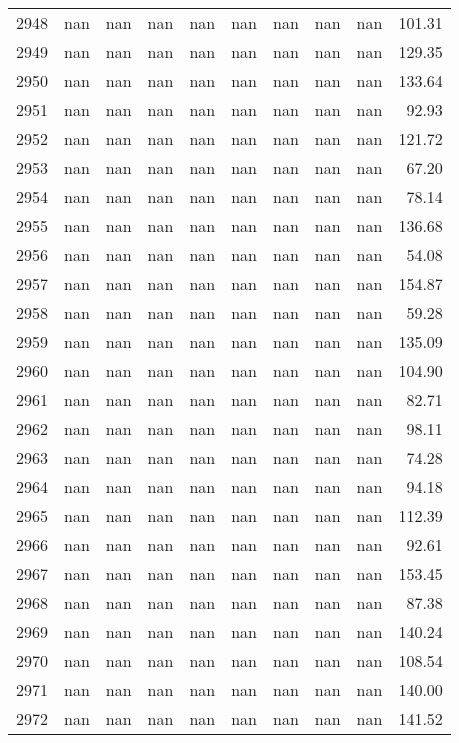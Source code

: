 \begin{tabular}{lrrrrrrrrr}
2948 & nan & nan & nan & nan & nan & nan & nan & nan & 101.31 \\
2949 & nan & nan & nan & nan & nan & nan & nan & nan & 129.35 \\
2950 & nan & nan & nan & nan & nan & nan & nan & nan & 133.64 \\
2951 & nan & nan & nan & nan & nan & nan & nan & nan & 92.93 \\
2952 & nan & nan & nan & nan & nan & nan & nan & nan & 121.72 \\
2953 & nan & nan & nan & nan & nan & nan & nan & nan & 67.20 \\
2954 & nan & nan & nan & nan & nan & nan & nan & nan & 78.14 \\
2955 & nan & nan & nan & nan & nan & nan & nan & nan & 136.68 \\
2956 & nan & nan & nan & nan & nan & nan & nan & nan & 54.08 \\
2957 & nan & nan & nan & nan & nan & nan & nan & nan & 154.87 \\
2958 & nan & nan & nan & nan & nan & nan & nan & nan & 59.28 \\
2959 & nan & nan & nan & nan & nan & nan & nan & nan & 135.09 \\
2960 & nan & nan & nan & nan & nan & nan & nan & nan & 104.90 \\
2961 & nan & nan & nan & nan & nan & nan & nan & nan & 82.71 \\
2962 & nan & nan & nan & nan & nan & nan & nan & nan & 98.11 \\
2963 & nan & nan & nan & nan & nan & nan & nan & nan & 74.28 \\
2964 & nan & nan & nan & nan & nan & nan & nan & nan & 94.18 \\
2965 & nan & nan & nan & nan & nan & nan & nan & nan & 112.39 \\
2966 & nan & nan & nan & nan & nan & nan & nan & nan & 92.61 \\
2967 & nan & nan & nan & nan & nan & nan & nan & nan & 153.45 \\
2968 & nan & nan & nan & nan & nan & nan & nan & nan & 87.38 \\
2969 & nan & nan & nan & nan & nan & nan & nan & nan & 140.24 \\
2970 & nan & nan & nan & nan & nan & nan & nan & nan & 108.54 \\
2971 & nan & nan & nan & nan & nan & nan & nan & nan & 140.00 \\
2972 & nan & nan & nan & nan & nan & nan & nan & nan & 141.52 \\

\end{tabular}
